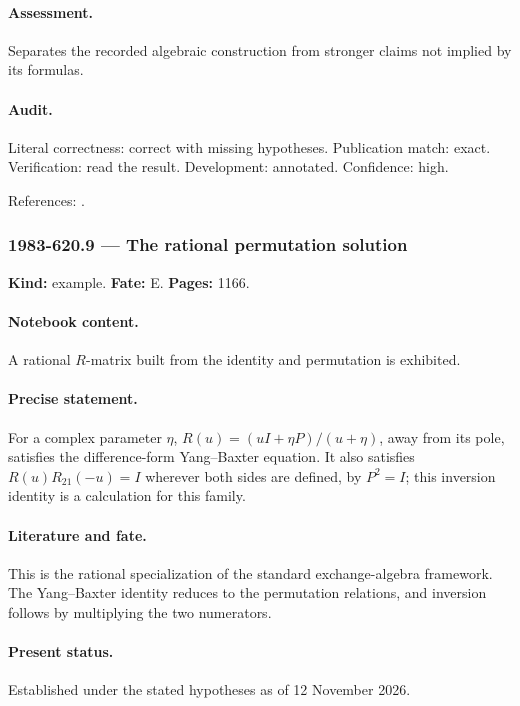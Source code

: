 \paragraph{Assessment.} Separates the recorded algebraic construction from stronger claims not implied by its formulas.

\paragraph{Audit.} Literal correctness: correct with missing hypotheses. Publication match: exact. Verification: read the result. Development: annotated. Confidence: high.

\noindent References: \citep{belavin1980discrete,cherednik1985finite}.\par

\subsubsection{1983-620.9 --- The rational permutation solution}

\label{item:1983-620.9}

\noindent\textbf{Kind:} example. \textbf{Fate:} E. \textbf{Pages:} 1166.\par

\paragraph{Notebook content.} A rational \(R\)-matrix built from the identity and permutation is exhibited.

\paragraph{Precise statement.} For a complex parameter \(\eta\), \(R(u)=(uI+\eta P)/(u+\eta)\), away from its pole, satisfies the difference-form Yang–Baxter equation. It also satisfies \(R(u)R_{21}(-u)=I\) wherever both sides are defined, by \(P^2=I\); this inversion identity is a calculation for this family.

\paragraph{Literature and fate.} This is the rational specialization of the standard exchange-algebra framework. The Yang–Baxter identity reduces to the permutation relations, and inversion follows by multiplying the two numerators.

\paragraph{Present status.} Established under the stated hypotheses as of 12 November 2026.

